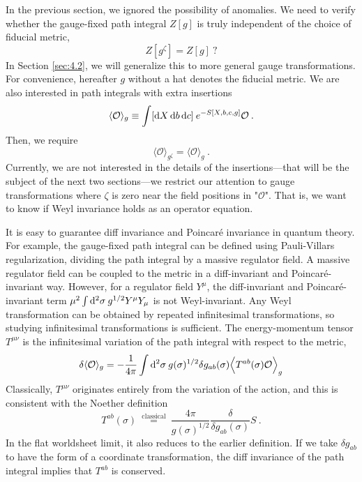 In the previous section, we ignored the possibility of anomalies. We need to verify whether the gauge-fixed path integral $Z[g]$ is truly independent of the choice of fiducial metric,    
\begin{equation}
	Z[g^{\zeta}]=Z[g]\:? \label{3.4.1}
\end{equation}
In Section \ref{sec:4.2}, we will generalize this to more general gauge transformations. For convenience, hereafter $g$ without a hat denotes the fiducial metric.    
We are also interested in path integrals with extra insertions    
\begin{equation}
	\langle\mathcal{O}\rangle_{g} \equiv \int[\mathrm{d} X\, \mathrm{d} b \, \mathrm{d} c] \:e^{-S[X, b, c, g]} \mathcal{O} \:. \label{3.4.2}
\end{equation}
Then, we require    
\begin{equation}
	\langle\mathcal{O}\rangle_{g ^\zeta}=\langle\mathcal{O}\rangle_{g} \:. \label{3.4.3}
\end{equation}
Currently, we are not interested in the details of the insertions—that will be the subject of the next two sections—we restrict our attention to gauge transformations where $\zeta$ is zero near the field positions in "$\mathcal{O}$". That is, we want to know if Weyl invariance holds as an operator equation.    

It is easy to guarantee diff invariance and Poincaré invariance in quantum theory. For example, the gauge-fixed path integral can be defined using Pauli-Villars regularization, dividing the path integral by a massive regulator field. A massive regulator field can be coupled to the metric in a diff-invariant and Poincaré-invariant way. However, for a regulator field $Y^\mu$, the diff-invariant and Poincaré-invariant term $\mu^{2}\int \mathrm{d}^{2} \sigma\: g^{1/2} Y^{\mu} Y_{\mu}$ is not Weyl-invariant. Any Weyl transformation can be obtained by repeated infinitesimal transformations, so studying infinitesimal transformations is sufficient.    
The energy-momentum tensor $T^{\mu\nu}$ is the infinitesimal variation of the path integral with respect to the metric,    
\begin{equation}\label{3.4.4}
	\delta\langle\mathcal{O}\rangle_{g}=-\frac{1}{4 \pi} \int \mathrm{d}^{2} \sigma \: g(\sigma)^{1 / 2} \delta g_{a b}(\sigma)\Bigl\langle T^{a b}(\sigma) \mathcal{O}\Bigr\rangle_{g}
\end{equation}
Classically, $T^{\mu\nu}$ originates entirely from the variation of the action, and this is consistent with the Noether definition    
\begin{equation}
	T^{a b}(\sigma) \stackrel{\text { classical }}{=} \frac{4 \pi}{g(\sigma)^{1 / 2}} \frac{\delta}{\delta g_{a b}(\sigma)} S \:. \label{3.4.5}
\end{equation}
In the flat worldsheet limit, it also reduces to the earlier definition. If we take $\delta g_{a b}$ to have the form of a coordinate transformation, the diff invariance of the path integral implies that $T^{ab}$ is conserved.    

